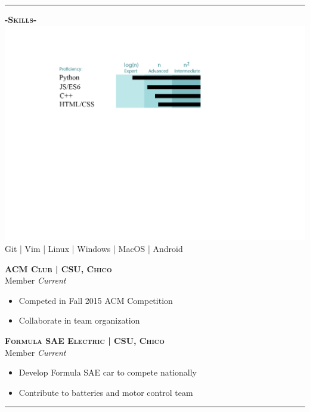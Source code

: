 \documentclass[12pt]{article}
\begin{document}
\noindent\rule{19cm}{0.4pt}
\bigskip
\begin{multicols}{2}
\begin{center}
\textbf{\textsc{-Skills-}}
\includegraphics[trim={2.8cm 7cm 2cm 2cm},clip]{ResumePic}
\smallskip
\footnotesize
\color{gray}Git | Vim | Linux | Windows | MacOS | Android
\end{center}
\columnbreak
\center
\footnotesize
\color{black}\textsc{\textbf{ACM Club | CSU, Chico}}\\

\color{Cerulean}Member \hfill \color{gray}\textit{Current}\\
\begin{itemize}
\setlength{\itemsep}{0pt}
	\item Competed in Fall 2015 ACM Competition
	\item Collaborate in team organization
\end{itemize}

\center
\color{black}\textsc{\textbf{Formula SAE Electric | CSU, Chico}}\\
\color{Cerulean}Member \hfill \color{gray}\textit{Current}

\begin{itemize}
\setlength{\itemsep}{0pt}
	\item Develop Formula SAE car to compete nationally
	\item Contribute to batteries and motor control team
\end{itemize}


\end{multicols}

\noindent\rule{19cm}{0.4pt}
\end{document}

